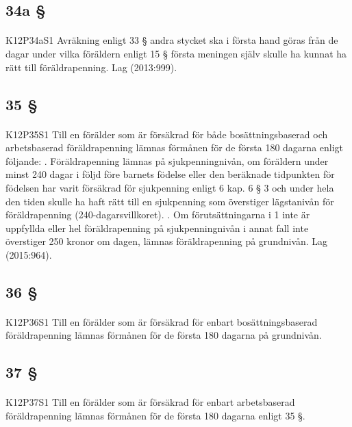 \documentclass[a4paper,notitlepage,openany,10pt]{book}
\begin{document}
\subsection*{34a §}
\paragraph*{}
{\tiny K12P34aS1}
Avräkning enligt 33 § andra stycket ska i första hand göras från de dagar under vilka föräldern enligt 15 § första meningen själv skulle ha kunnat ha rätt till föräldrapenning.
Lag (2013:999).
\subsection*{35 §}
\paragraph*{}
{\tiny K12P35S1}
Till en förälder som är försäkrad för både bosättningsbaserad och arbetsbaserad föräldrapenning lämnas förmånen för de första 180 dagarna enligt följande:
. Föräldrapenning lämnas på sjukpenningnivån, om föräldern under minst 240 dagar i följd före barnets födelse eller den beräknade tidpunkten för födelsen har varit försäkrad för sjukpenning enligt 6 kap. 6 § 3 och under hela den tiden skulle ha haft rätt till en sjukpenning som överstiger lägstanivån för föräldrapenning (240-dagarsvillkoret).
. Om förutsättningarna i 1 inte är uppfyllda eller hel föräldrapenning på sjukpenningnivån i annat fall inte överstiger 250 kronor om dagen, lämnas föräldrapenning på grundnivån.
Lag (2015:964).
\subsection*{36 §}
\paragraph*{}
{\tiny K12P36S1}
Till en förälder som är försäkrad för enbart bosättningsbaserad föräldrapenning lämnas förmånen för de första 180 dagarna på grundnivån.
\subsection*{37 §}
\paragraph*{}
{\tiny K12P37S1}
Till en förälder som är försäkrad för enbart arbetsbaserad föräldrapenning lämnas förmånen för de första 180 dagarna enligt 35 §.
\end{document}
